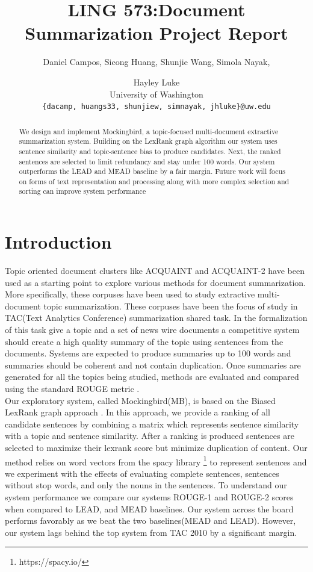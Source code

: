 \documentclass[11pt,a4paper]{article}
\title{LING 573:Document Summarization Project Report}
\author{Daniel Campos, Sicong Huang, Shunjie Wang, Simola Nayak, \and Hayley Luke \\ University of Washington \\ {\tt\{dacamp, huangs33, shunjiew, simnayak, jhluke\}@uw.edu}}
\begin{document}
\maketitle
\begin{abstract}
We design and implement Mockingbird, a topic-focused multi-document extractive summarization system. Building on the LexRank graph algorithm our system uses sentence similarity and topic-sentence bias to produce candidates. Next, the ranked sentences are selected to limit redundancy and stay under 100 words. Our system outperforms the LEAD and MEAD baseline by a fair margin. Future work will focus on forms of text representation and processing along with more complex selection and sorting can improve system performance
\end{abstract}
\section{Introduction}
Topic oriented document clusters like ACQUAINT \cite{Graff2002TheAC} and ACQUAINT-2 have been used as a starting point to explore various methods for document summarization. More specifically, these corpuses have been used to study extractive multi-document topic summarization. These corpuses have been the focus of study in TAC(Text Analytics Conference) \cite{Dang2008OverviewOT} summarization shared task. In the formalization of this task give a topic and a set of news wire documents a competitive system should create a high quality summary of the topic using sentences from the documents. Systems are expected to produce summaries up to 100 words and summaries should be coherent and not contain duplication. Once summaries are generated for all the topics being studied, methods are evaluated and compared using the standard ROUGE metric \cite{Lin2004ROUGEAP}.  \\ Our exploratory system, called Mockingbird(MB), is based on the Biased LexRank graph approach \cite{Otterbacher2009BiasedLP}. In this approach, we provide a ranking of all candidate sentences by combining a matrix which represents sentence similarity with a topic and sentence similarity. After a ranking is produced sentences are selected to maximize their lexrank score but minimize duplication of content. Our method relies on word vectors \cite{Mikolov2013DistributedRO} from the spacy library \footnote{https://spacy.io/} to represent sentences and we experiment with the effects of evaluating complete sentences, sentences without stop words, and only the nouns in the sentences. To understand our system performance we compare our systems ROUGE-1 and ROUGE-2 scores when compared to LEAD, and MEAD baselines. Our system across the board performs favorably as we beat the two baselines(MEAD and LEAD). However, our system lags behind the top system from TAC 2010 by a significant margin.
\end{document}
